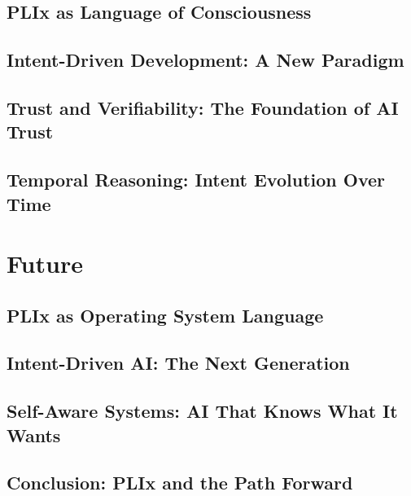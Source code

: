 \documentclass[11pt,a4paper,twoside]{book}
\theoremstyle{definition}
\theoremstyle{remark}
\begin{document}
\chapter{PLIx as Language of Consciousness}
\label{ch:17}


\chapter{Intent-Driven Development: A New Paradigm}
\label{ch:18}


\chapter{Trust and Verifiability: The Foundation of AI Trust}
\label{ch:19}


\chapter{Temporal Reasoning: Intent Evolution Over Time}
\label{ch:20}


\part{Future}
\label{part:future}

\chapter{PLIx as Operating System Language}
\label{ch:21}


\chapter{Intent-Driven AI: The Next Generation}
\label{ch:22}


\chapter{Self-Aware Systems: AI That Knows What It Wants}
\label{ch:23}


\chapter{Conclusion: PLIx and the Path Forward}
\label{ch:24}


\backmatter

\printindex

\makeatletter
{}
\makeatother
\end{document}
